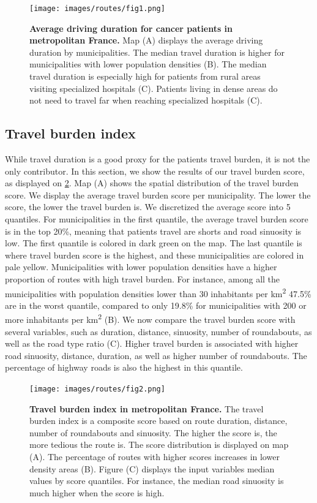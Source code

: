 \begin{figure}[H]
    \texttt{[image: images/routes/fig1.png]}
    \centering
    \caption{ \textbf{Average driving duration for cancer patients in
            metropolitan France.} Map (A) displays the average driving duration by
        municipalities. The median travel duration is higher for municipalities
        with lower population densities (B). The median travel duration is
        especially high for patients from rural areas visiting specialized
        hospitals (C). Patients living in dense areas do not need to travel far
        when reaching specialized hospitals (C). }
    \label{fig:routes-duration-france}
\end{figure}

\subsection{Travel burden index}

While travel duration is a good proxy for the patients travel burden, it is not
the only contributor. In this section, we show the results of our travel burden
score, as displayed on \cref{fig:routes-burden-index}. Map (A) shows the spatial
distribution of the travel burden score. We display the average travel burden
score per municipality. The lower the score, the lower the travel burden is. We
discretized the average score into 5 quantiles. For municipalities in the first
quantile, the average travel burden score is in the top 20\%, meaning that
patients travel are shorts and road sinuosity is low. The first quantile is
colored in dark green on the map. The last quantile is where travel burden score
is the highest, and these municipalities are colored in pale yellow.
Municipalities with lower population densities have a higher proportion of
routes with high travel burden. For instance, among all the municipalities with
population densities lower than 30 inhabitants per km\textsuperscript{2} 47.5\%
are in the worst quantile, compared to only 19.8\% for municipalities with 200
or more inhabitants per km\textsuperscript{2} (B). We now compare the travel
burden score with several variables, such as duration, distance, sinuosity,
number of roundabouts, as well as the road type ratio (C). Higher travel burden
is associated with higher road sinuosity, distance, duration, as well as higher
number of roundabouts. The percentage of highway roads is also the highest in
this quantile.

\begin{figure}[H]
    \texttt{[image: images/routes/fig2.png]}
    \centering
    \caption{
        \textbf{Travel burden index in metropolitan France.}
        The travel burden index is a composite score based on route duration,
        distance, number of roundabouts and sinuosity. The higher the score is,
        the more tedious the route is. The score distribution is displayed on
        map (A). The percentage of routes with higher scores increases in lower
        density areas (B). Figure (C) displays the input variables median values
        by score quantiles. For instance, the median road sinuosity is much
        higher when the score is high. }
    \label{fig:routes-burden-index}
\end{figure}

